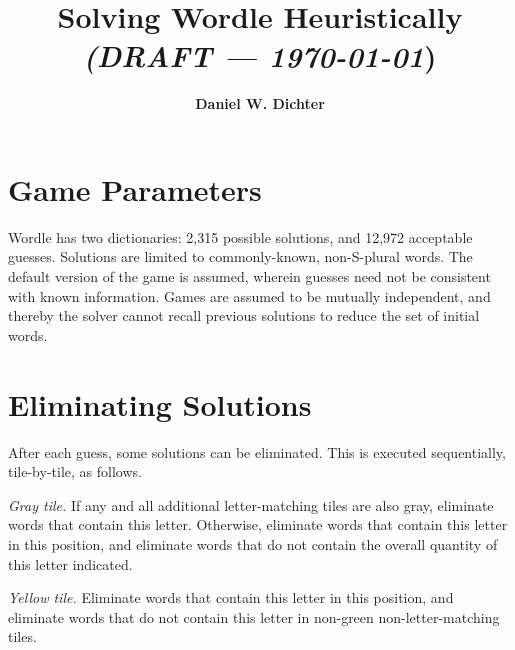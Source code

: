 \documentclass[twocolumn]{tudelft-aiaa}
\title{Solving Wordle Heuristically \normalsize \color{red} \emph{(DRAFT --- \today}) \color{black}}
\author{\textbf{Daniel W. Dichter}}
\affil{Independent Researcher\\Cambridge, Massachusetts, U.S.A.\\daniel.w.dichter@gmail.com}
\begin{document}


\section{Game Parameters}

Wordle has two dictionaries: 2,315 possible solutions, and 12,972 acceptable guesses.\cite{Wardle}\cite{Glaiel} Solutions are limited to commonly-known, non-S-plural words. The default version of the game is assumed, wherein guesses need not be consistent with known information. Games are assumed to be mutually independent, and thereby the solver cannot recall previous solutions to reduce the set of initial words.

\section{Eliminating Solutions}

After each guess, some solutions can be eliminated. This is executed sequentially, tile-by-tile, as follows.

\emph{Gray tile.} If any and all additional letter-matching tiles are also gray, eliminate words that contain this letter. Otherwise, eliminate words that contain this letter in this position, and eliminate words that do not contain the overall quantity of this letter indicated.

\emph{Yellow tile.} Eliminate words that contain this letter in this position, and eliminate words that do not contain this letter in non-green non-letter-matching tiles.
\end{document}
